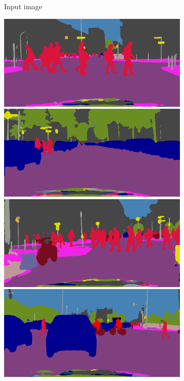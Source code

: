 \begin{figure}[t]
{\begin{subfigure}[t]{0.24\linewidth}
\begin{center}
  \caption{Input image}
\end{center}
\end{subfigure}
\begin{subfigure}[t]{0.24\linewidth}
\begin{center}
		\includegraphics[width=\linewidth,trim={0px 60px 0 0px},clip]{results/segnet_107_output_1.png}
		\includegraphics[width=\linewidth,trim={0px 60px 0 0px},clip]{results/segnet_186_output_1.png}
		\includegraphics[width=\linewidth,trim={0px 60px 0 0px},clip]{results/segnet_242_output_1.png}
		\includegraphics[width=\linewidth,trim={0px 60px 0 0px},clip]{results/segnet_209_output_1.png}

\end{center}
\end{subfigure}}
\end{figure}
